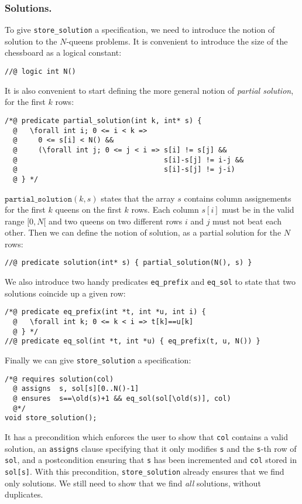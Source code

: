 \documentclass[a4paper]{llncs}
\begin{document}
\subsubsection{Solutions.}
To give \texttt{store\_solution} a specification, we need to introduce
the notion of solution to the $N$-queens problems. It is convenient to
introduce the size of the chessboard as a logical constant:
\begin{verbatim}
//@ logic int N()
\end{verbatim}
It is also convenient to start defining the more general notion of
\emph{partial solution}, for the first $k$ rows:
\begin{verbatim}
/*@ predicate partial_solution(int k, int* s) {
  @   \forall int i; 0 <= i < k => 
  @     0 <= s[i] < N() &&
  @     (\forall int j; 0 <= j < i => s[i] != s[j] &&
  @                                   s[i]-s[j] != i-j &&
  @                                   s[i]-s[j] != j-i)
  @ } */
\end{verbatim}
$\mathtt{partial\_solution}(k,s)$ states that the array $s$ contains
column assignements for the first $k$ queens on the first $k$
rows. Each column $s[i]$ must be in the valid range $[0,N[$ and two
queens on two different rows $i$ and $j$ must not beat each other.
Then we can define the notion of solution, as a partial solution for
the $N$ rows:
\begin{verbatim}
//@ predicate solution(int* s) { partial_solution(N(), s) }
\end{verbatim}
We also introduce two handy predicates \texttt{eq\_prefix} and
\texttt{eq\_sol} to state that two solutions coincide up a given row:
\begin{verbatim}
/*@ predicate eq_prefix(int *t, int *u, int i) {
  @   \forall int k; 0 <= k < i => t[k]==u[k]
  @ } */
//@ predicate eq_sol(int *t, int *u) { eq_prefix(t, u, N()) } 
\end{verbatim}
Finally we can give \texttt{store\_solution} a specification:
\begin{verbatim}
/*@ requires solution(col)
  @ assigns  s, sol[s][0..N()-1]
  @ ensures  s==\old(s)+1 && eq_sol(sol[\old(s)], col)
  @*/
void store_solution();
\end{verbatim}
It has a precondition which enforces the user to show that
\texttt{col} contains a valid solution, an \texttt{assigns} clause
specifying that it only modifies \texttt{s} and the \texttt{s}-th row
of \texttt{sol}, and a postcondition ensuring that \texttt{s} has been
incremented and \texttt{col} stored in \verb!sol[s]!.
With this precondition, \texttt{store\_solution} already ensures that
we find only solutions. We still need to show that we find \emph{all}
solutions, without duplicates.
\end{document}
